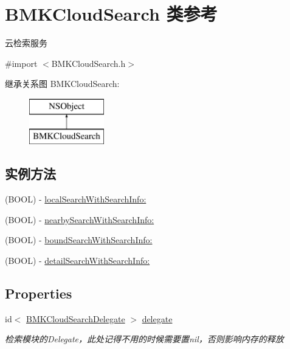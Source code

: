 \hypertarget{interface_b_m_k_cloud_search}{\section{B\-M\-K\-Cloud\-Search 类参考}
\label{interface_b_m_k_cloud_search}
}


云检索服务  




{\ttfamily \#import $<$B\-M\-K\-Cloud\-Search.\-h$>$}

继承关系图 B\-M\-K\-Cloud\-Search\-:\begin{figure}[H]
\begin{center}
\leavevmode
\includegraphics[height=2.000000cm]{interface_b_m_k_cloud_search}
\end{center}
\end{figure}
\subsection*{实例方法}
\begin{DoxyCompactItemize}
\item 
(B\-O\-O\-L) -\/ \hyperlink{interface_b_m_k_cloud_search_a473c4aeff275be5840ac6cf8010ce1d8}{local\-Search\-With\-Search\-Info\-:}
\item 
(B\-O\-O\-L) -\/ \hyperlink{interface_b_m_k_cloud_search_abe65e1b2f2b67e1d081c697caae80e4b}{nearby\-Search\-With\-Search\-Info\-:}
\item 
(B\-O\-O\-L) -\/ \hyperlink{interface_b_m_k_cloud_search_a7b2a5b409e884fb240e94f42cbad5208}{bound\-Search\-With\-Search\-Info\-:}
\item 
(B\-O\-O\-L) -\/ \hyperlink{interface_b_m_k_cloud_search_aaa7dcb1e49edd705290a3e79d8d22e92}{detail\-Search\-With\-Search\-Info\-:}
\end{DoxyCompactItemize}
\subsection*{Properties}
\begin{DoxyCompactItemize}
\item 
\hypertarget{interface_b_m_k_cloud_search_ac35ac10ba735ab371814e2d69c27af23}{id$<$ \hyperlink{protocol_b_m_k_cloud_search_delegate-p}{B\-M\-K\-Cloud\-Search\-Delegate} $>$ \hyperlink{interface_b_m_k_cloud_search_ac35ac10ba735ab371814e2d69c27af23}{delegate}}\label{interface_b_m_k_cloud_search_ac35ac10ba735ab371814e2d69c27af23}

\begin{DoxyCompactList}\small\item\em 检索模块的\-Delegate，此处记得不用的时候需要置nil，否则影响内存的释放 \end{DoxyCompactList}\end{DoxyCompactItemize}


